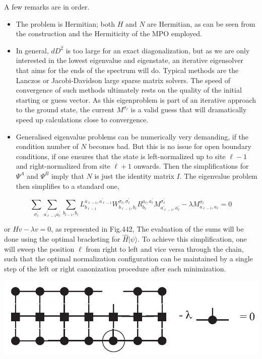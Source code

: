 \documentclass[12pt]{article}
\begin{document}
A few remarks are in order.

\begin{itemize}
  \item The problem is Hermitian; both $H$ and $N$ are Hermitian, as can be seen from the construction and the Hermiticity of the MPO employed.
  \item In general, $d D^{2}$ is too large for an exact diagonalization, but as we are only interested in the lowest eigenvalue and eigenstate, an iterative eigensolver that aims for the ends of the spectrum will do. Typical methods are the Lanczos or Jacobi-Davidson large sparse matrix solvers. The speed of convergence of such methods ultimately rests on the quality of the initial starting or guess vector. As this eigenproblem is part of an iterative approach to the ground state, the current $M^{\sigma_{\ell}}$ is a valid guess that will dramatically speed up calculations close to convergence.
  \item Generalised eigenvalue problems can be numerically very demanding, if the condition number of $N$ becomes bad. But this is no issue for open boundary conditions, if one ensures that the state is left-normalized up to site $\ell-1$ and right-normalized from site $\ell+1$ onwards. Then the simplifications for $\Psi^{A}$ and $\Psi^{B}$ imply that $N$ is just the identity matrix $I$. The eigenvalue problem then simplifies to a standard one,
\end{itemize}


\begin{equation*}
\sum_{\sigma_{\ell}^{\prime}} \sum_{a_{\ell-1}^{\prime} a_{\ell}^{\prime}} \sum_{b_{t-1}, b_{\ell}} L_{b_{\ell-1}}^{a_{\ell-1}, a_{\ell-1}^{\prime}} W_{b_{\ell-1}, b_{\ell}}^{\sigma_{t}, \sigma_{\ell}^{\prime}} R_{b_{\ell}}^{a_{\ell}, a_{\ell}^{\prime}} M_{a_{\ell-1}^{\prime}, a_{\ell}^{\prime}}^{\sigma_{\ell}^{\prime}}-\lambda M_{a_{\ell-1}, a_{\ell}}^{\sigma_{\ell}}=0 \tag{211}
\end{equation*}


or $H v-\lambda v=0$, as represented in Fig.442, The evaluation of the sums will be done using the optimal bracketing for $\hat{H}|\psi\rangle$. To achieve this simplification, one will sweep the position $\ell$ from right to left and vice versa through the chain, such that the optimal normalization configuration can be maintained by a single step of the left or right canonization procedure after each minimization.

\begin{center}
\includegraphics[max width=\textwidth]{2024_05_04_afc4ad226da9ccfe0ac8g-067}
\end{center}
\end{document}
